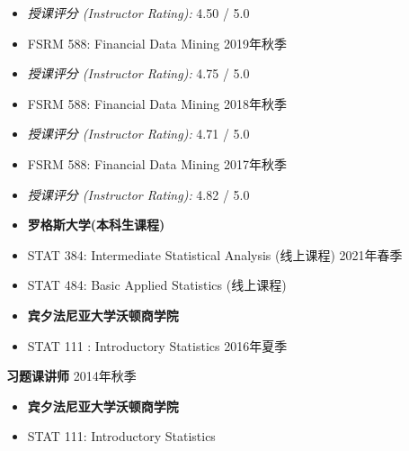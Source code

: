 \documentclass[margin, line]{res}
\begin{document}
\begin{resume}
\begin{itemize}
            \item[] {\it 授课评分 (Instructor Rating):} 4.50 / 5.0

            \item[] FSRM 588: Financial Data Mining \hfill{2019年秋季}

            \item[] {\it 授课评分 (Instructor Rating):} 4.75 / 5.0

            \item[] FSRM 588: Financial Data Mining \hfill{2018年秋季}

            \item[] {\it 授课评分 (Instructor Rating):} 4.71 / 5.0

            \item[] FSRM 588: Financial Data Mining \hfill{2017年秋季}

            \item[] {\it 授课评分 (Instructor Rating):} 4.82 / 5.0

            \item[-] {\bf 罗格斯大学(本科生课程)}

            \item[] STAT 384: Intermediate Statistical Analysis (线上课程) \hfill{2021年春季}

            \item[] STAT 484: Basic Applied Statistics (线上课程) 
        \end{itemize}
        \vspace*{1mm}
        \begin{itemize}
            \item[-] {\bf 宾夕法尼亚大学沃顿商学院}

            \item[] STAT 111 : Introductory Statistics \hfill{2016年夏季}
            
        \end{itemize}

        \vspace{-3mm}

        {\bf 习题课讲师} \hfill{2014年秋季}
        \begin{itemize}
            \item[] {\bf 宾夕法尼亚大学沃顿商学院}

            \item[] STAT 111: Introductory Statistics
        \end{itemize}

        \vspace{-3mm}


\end{resume}
\end{document}
